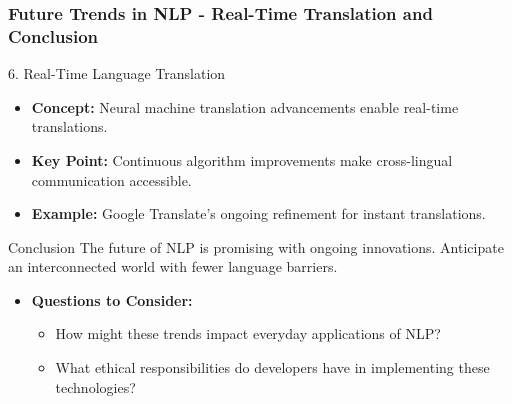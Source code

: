 \documentclass{beamer}
\begin{document}
\begin{frame}[fragile]
    \frametitle{Future Trends in NLP - Real-Time Translation and Conclusion}
    \begin{block}{6. Real-Time Language Translation}
        \begin{itemize}
            \item \textbf{Concept:} Neural machine translation advancements enable real-time translations.
            \item \textbf{Key Point:} Continuous algorithm improvements make cross-lingual communication accessible.
            \item \textbf{Example:} Google Translate's ongoing refinement for instant translations.
        \end{itemize}
    \end{block}

    \begin{block}{Conclusion}
        The future of NLP is promising with ongoing innovations. Anticipate an interconnected world with fewer language barriers.
    \end{block}
    
    \begin{itemize}
        \item \textbf{Questions to Consider:}
        \begin{itemize}
            \item How might these trends impact everyday applications of NLP?
            \item What ethical responsibilities do developers have in implementing these technologies?
        \end{itemize}
    \end{itemize}
\end{frame}
\end{document}
